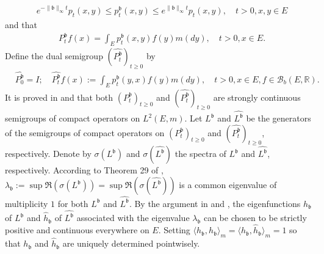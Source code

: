 \documentclass[12pt,a4paper]{amsart}
\numberwithin{equation}{section}
\theoremstyle{plain}
\theoremstyle{definition}
\theoremstyle{remark}
\newcounter{N}
\newcounter{n}[N]
\begin{document}
\begin{align} \label{eq:IU.0}
& e^{-\|\mathfrak b\|_\infty t} p_t(x,y) \leq p_t^\mathfrak b(x,y) \leq e^{\|\mathfrak b\|_\infty t}p_t(x,y),\quad t>0, x,y\in E\end{align}
and that
\begin{align} & P_t^\mathfrak b f(x) = \int_E p_t^\mathfrak b(x,y) f(y) m(dy),\quad t>0, x\in E. \end{align}
Define the dual semigroup $(\widehat {P^{\mathfrak b}_t} )_{t\geq 0}$ by
\begin{align} & \widehat {P_0^{\mathfrak b}}=I; \quad \widehat {P_t^{\mathfrak b}} f(x):= \int_E p_t^\mathfrak b(y,x) f(y) m(dy), \quad t>0,x\in E, f\in \mathcal B_b(E,\mathbb R). \end{align}
It is proved in \cite{RenSongZhang2015Limit} and \cite{RenSongZhang2017Central} that both $(P_t^\mathfrak b)_{t\geq 0}$ and $(\widehat {P_t^\mathfrak b})_{t\geq 0}$ are strongly continuous semigroups of compact operators on $L^2(E,m)$.
Let $L^\mathfrak b$ and $\widehat {L^\mathfrak b}$ be the generators of the semigroups of compact operators on $(P_t^\mathfrak b)_{t\geq 0}$ and $(\widehat {P_t^\mathfrak b})_{t\geq 0}$, respectively.
Denote by $\sigma(L^\mathfrak b)$ and $\sigma(\widehat{L^\mathfrak b})$ the spectra of $L^\mathfrak b$ and $\widehat {L^{\mathfrak b}}$, respectively.
According to Theorem 29 of \cite{Schaefer1974Banach}, $\lambda_\mathfrak b:= \sup \Re(\sigma(L^\mathfrak b)) = \sup \Re(\sigma( \widehat{L^\mathfrak b})) $ is a common eigenvalue of multiplicity $1$ for both $L^\mathfrak b$ and $\widehat {L^{\mathfrak b}}$.
By the argument in \cite{RenSongZhang2015Limit} and \cite{RenSongZhang2017Central}, the eigenfunctions $h_\mathfrak b$ of $L^\mathfrak b$ and $\widehat h_\mathfrak b$ of $\widehat{L^\mathfrak b}$ associated with the eigenvalue $\lambda_\mathfrak b$ can be chosen to be strictly positive and continuous everywhere on $E$.
Setting $\langle h_\mathfrak b,h_\mathfrak b\rangle_m = \langle h_\mathfrak b, \widehat h_\mathfrak b\rangle_m = 1$ so that $h_\mathfrak b$ and $\widehat h_\mathfrak b$ are uniquely determined pointwisely.
\end{document}
